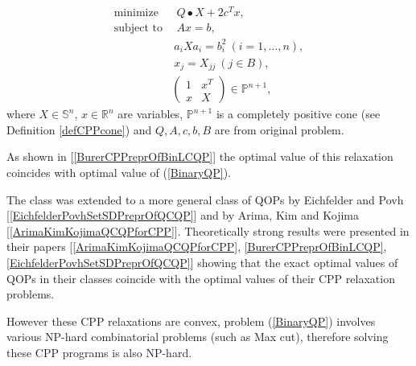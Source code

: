 \documentclass[12pt]{book}
\theoremstyle{definition}
\begin{document}
\begin{equation}
\label{BinaryQP CCP Relaxation}
\begin{array}{ll}
\mbox{minimize}&\ \ Q\bullet X + 2c^Tx ,\\
\mbox{subject to}&\ \ Ax = b,\\
				 & \ a_iXa_i = b_i^2 \ (i=1,\dots ,n), \\
				 & \ x_j = X_{jj} \ (j \in B), \\
				 &\left(\begin{array}{rr} 1 & x^T \\ x & X\end{array}\right) \in \mathbb{P}^{n+1}, 
\end{array}
\end{equation}
where $X\in \mathbb{S}^n$, $x\in\mathbb{R}^n$ are variables, $\mathbb{P}^{n+1}$ is a completely positive cone (see Definition \ref{defCPPcone}) and $Q,A,c,b,B$ are from original problem. 

As shown in [\ref{BurerCPPreprOfBinLCQP}] the optimal value of this relaxation coincides with optimal value of (\ref{BinaryQP}).

The class was extended to a more general class of QOPs by Eichfelder and
Povh [\ref{EichfelderPovhSetSDPreprOfQCQP}] and by Arima, Kim and Kojima [\ref{ArimaKimKojimaQCQPforCPP}]. Theoretically strong results were presented in
their papers [\ref{ArimaKimKojimaQCQPforCPP}, \ref{BurerCPPreprOfBinLCQP}, \ref{EichfelderPovhSetSDPreprOfQCQP}] showing that the exact optimal values of QOPs in their classes coincide
with the optimal values of their CPP relaxation problems.

However these CPP relaxations are convex, problem (\ref{BinaryQP}) involves various NP-hard combinatorial problems (such as Max cut), therefore solving these CPP programs is also NP-hard. 
\end{document}
